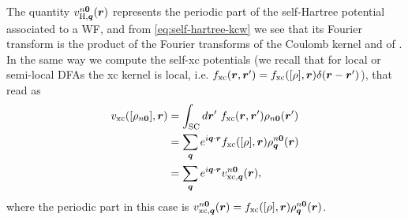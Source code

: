 The quantity $v_{{\rm H},{\bm q}}^{n{\bm 0}}({\bm r})$ represents the periodic part of the self-Hartree potential associated to a WF, and from \cref{eq:self-hartree-kcw} we see that its Fourier transform is the product of the Fourier transforms of the Coulomb kernel and of . In the same way we compute the self-xc potentials (we recall that for local or semi-local DFAs the xc kernel is local, i.e. $f_{\rm xc}({\bm r},{\bm r}') = f_{\rm xc}([\rho],{\bm r}) \delta({\bm r}-{\bm r}')$), that read as
%
\begin{equation}
    \begin{split}
        v_{\rm xc}([\rho_{n{\bm 0}}],{\bm r}) &= \int_{\rm SC} d{\bm r}' \ f_{\rm xc}({\bm r},{\bm r}') \rho_{n{\bm 0}}({\bm r}') \\
        &= \sum_{{\bm q}} e^{i {\bm q} \cdot {\bm r}} f_{\rm xc}([\rho],{\bm r}) \rho^{n {\bm 0}}_{{\bm q}} ({\bm r}) \\
        &= \sum_{{\bm q}} e^{i {\bm q} \cdot {\bm r}} v_{{\rm xc},{\bm q}}^{n{\bm 0}}({\bm r}) ,
    \end{split}
    \label{eq:self-xc-kcw}
\end{equation}
%
where the periodic part in this case is $v_{{\rm xc},{\bm q}}^{n{\bm 0}}({\bm r}) = f_{\rm xc}([\rho],{\bm r}) \rho^{n {\bm 0}}_{{\bm q}} ({\bm r})$.

